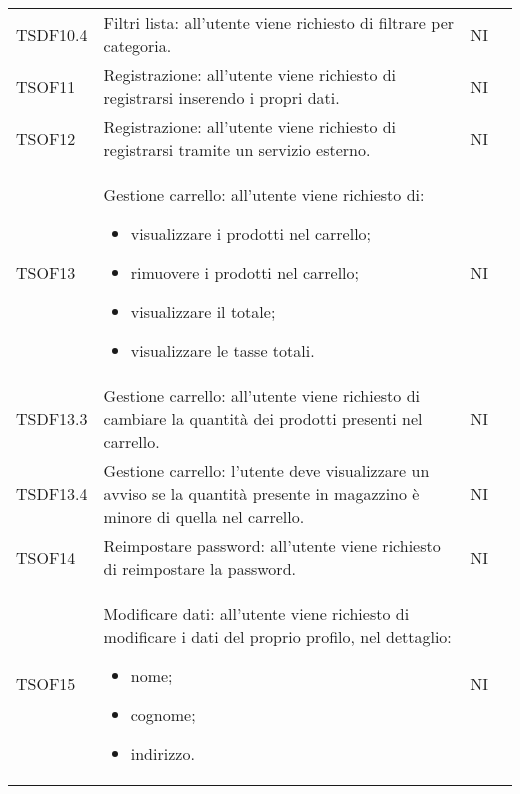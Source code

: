 \begin{center}
\begin{longtable}[!h]{p{50px} p{245px} p{75px} p{50px}}
        TSDF10.4                         & Filtri lista: all'utente viene richiesto di filtrare per categoria.                                                                                                 & NI             \\
        TSOF11                           & Registrazione: all'utente viene richiesto di registrarsi inserendo i propri dati.                                                                                   & NI             \\
        TSOF12                           & Registrazione: all'utente viene richiesto di registrarsi tramite un servizio esterno.                                                                               & NI             \\
        TSOF13                           & Gestione carrello: all'utente viene richiesto di: \begin{itemize} \item visualizzare i prodotti nel carrello; \item rimuovere i prodotti nel carrello; \item visualizzare il totale; \item visualizzare le tasse totali. \end{itemize}                                                                                        & NI             \\
        TSDF13.3                         & Gestione carrello: all'utente viene richiesto di cambiare la quantità dei prodotti presenti nel carrello.                                                           & NI             \\
        TSDF13.4                         & Gestione carrello: l'utente deve visualizzare un avviso se la quantità presente in magazzino è minore di quella nel carrello.                                       & NI             \\
        TSOF14                           & Reimpostare password: all'utente viene richiesto di reimpostare la password.                                                                                        & NI             \\
        TSOF15                           & Modificare dati: all'utente viene richiesto di modificare i dati del proprio profilo, nel dettaglio: \begin{itemize} \item nome; \item cognome; \item indirizzo. \end{itemize}                                     & NI             \\

\end{longtable}
\end{center}
